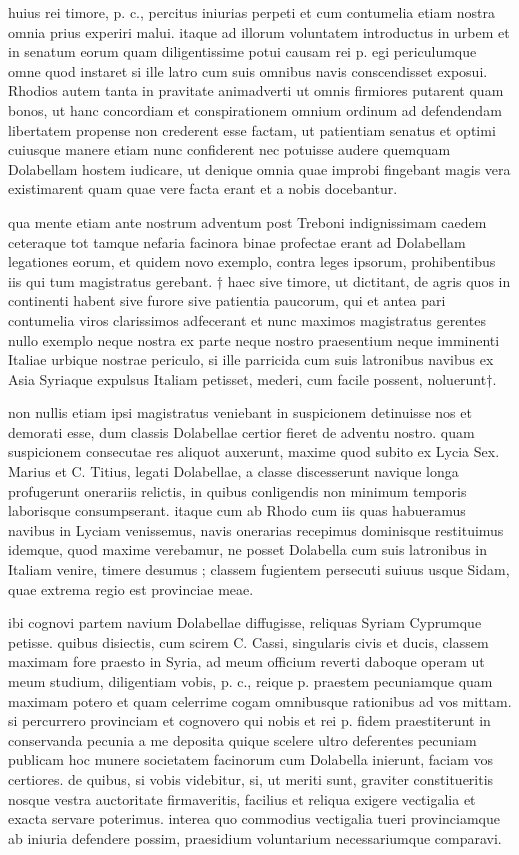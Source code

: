  huius rei timore, p. c., percitus iniurias perpeti et cum contumelia etiam nostra omnia prius experiri malui. itaque ad illorum voluntatem introductus in urbem et in senatum eorum quam diligentissime potui causam rei p. egi periculumque omne quod instaret si ille latro cum suis omnibus navis conscendisset exposui. Rhodios autem tanta in pravitate animadverti ut omnis firmiores putarent quam bonos, ut hanc concordiam et conspirationem omnium ordinum ad defendendam libertatem propense non crederent esse factam, ut patientiam senatus et optimi cuiusque manere etiam nunc confiderent nec potuisse audere quemquam Dolabellam hostem iudicare, ut denique omnia quae improbi fingebant magis vera existimarent quam quae vere facta erant et a nobis docebantur.

 qua mente etiam ante nostrum adventum post Treboni indignissimam caedem ceteraque tot tamque nefaria facinora binae profectae erant ad Dolabellam legationes eorum, et quidem novo exemplo, contra leges ipsorum, prohibentibus iis qui tum magistratus gerebant. † haec sive timore, ut dictitant, de agris quos in continenti habent sive furore sive patientia paucorum, qui et antea pari contumelia viros clarissimos adfecerant et nunc maximos magistratus gerentes nullo exemplo neque nostra ex parte neque nostro praesentium neque imminenti Italiae urbique nostrae periculo, si ille parricida cum suis latronibus navibus ex Asia Syriaque expulsus Italiam petisset, mederi, cum facile possent, noluerunt†.

 non nullis etiam ipsi magistratus veniebant in suspicionem detinuisse nos et demorati esse, dum classis Dolabellae certior fieret de adventu nostro. quam suspicionem consecutae res aliquot auxerunt, maxime quod subito ex Lycia Sex. Marius et C. Titius, legati Dolabellae, a classe discesserunt navique longa profugerunt onerariis relictis, in quibus conligendis non minimum temporis laborisque consumpserant. itaque cum ab Rhodo cum iis quas habueramus navibus in Lyciam venissemus, navis onerarias recepimus dominisque restituimus idemque, quod maxime verebamur, ne posset Dolabella cum suis latronibus in Italiam venire, timere desumus ; classem fugientem persecuti suiuus usque Sidam, quae extrema regio est provinciae meae.

 ibi cognovi partem navium Dolabellae diffugisse, reliquas Syriam Cyprumque petisse. quibus disiectis, cum scirem C. Cassi, singularis civis et ducis, classem maximam fore praesto in Syria, ad meum officium reverti daboque operam ut meum studium, diligentiam vobis, p. c., reique p. praestem pecuniamque quam maximam potero et quam celerrime cogam omnibusque rationibus ad vos mittam. si percurrero provinciam et cognovero qui nobis et rei p. fidem praestiterunt in conservanda pecunia a me deposita quique scelere ultro deferentes pecuniam publicam hoc munere societatem facinorum cum Dolabella inierunt, faciam vos certiores. de quibus, si vobis videbitur, si, ut meriti sunt, graviter constitueritis nosque vestra auctoritate firmaveritis, facilius et reliqua exigere vectigalia et exacta servare poterimus. interea quo commodius vectigalia tueri provinciamque ab iniuria defendere possim, praesidium voluntarium necessariumque comparavi.

